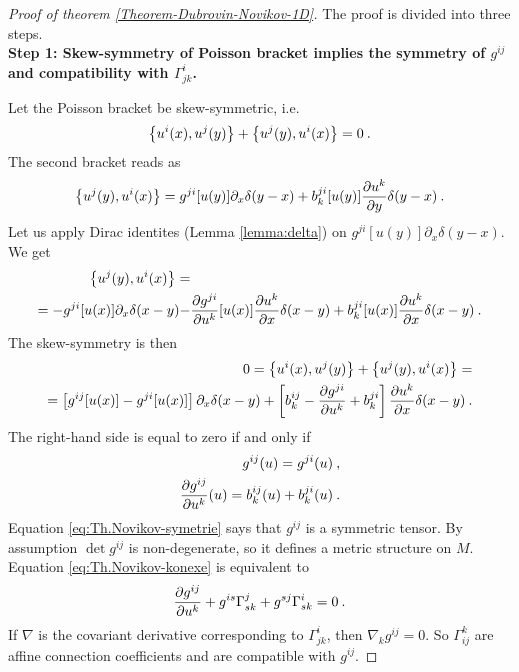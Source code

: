 \begin{proof}[Proof of theorem \ref{Theorem-Dubrovin-Novikov-1D}]
    The proof is divided into three steps.
    \\
    \textbf{Step 1: Skew-symmetry of Poisson bracket implies the symmetry of $g^{ij}$ and compatibility with $\Gamma^i_{jk}$.}

    Let the Poisson bracket be skew-symmetric, i.e.
    \begin{align}
        \left \lbrace u^i(x),u^j(y) \right \rbrace + \left \lbrace u^j(y),u^i(x) \right \rbrace = 0 \:.
    \end{align}
    The second bracket reads as
    \begin{align}
        \left \lbrace u^j(y),u^i(x) \right \rbrace =  g^{ji}[u(y)] \partial_x \delta(y-x) + b^{ji}_k[u(y)] \frac{\partial u^k}{\partial y} \delta(y-x) \:.
    \end{align}
    Let us apply Dirac identites (Lemma \vref{lemma:delta}) on $g^{ji}[u(y)]\partial_x \delta(y-x)$. We get
    \begin{align}
        \left \lbrace u^j(y),u^i(x) \right \rbrace =& \nonumber \\ 
        = - g^{ji} [u(x)] \partial_x \delta(x-y) -& \frac{\partial g^{ji}}{\partial u^k}[u(x)] \frac{\partial u^k}{\partial x} \delta(x-y) + b^{ji}_k[u(x)] \frac{\partial u^k}{\partial x} \delta(x-y)
        \:.
    \end{align}
    The skew-symmetry is then
    \begin{align}
        0 = \left \lbrace u^i(x),u^j(y) \right \rbrace + \left \lbrace u^j(y),u^i(x) \right \rbrace = \nonumber
        \\= \left[ g^{ij}[u(x)]  - g^{ji}[u(x)] \right] \partial_x \delta(x-y) + \left[ b^{ij}_k - \frac{\partial g^{ji}}{\partial u^k}  + b^{ji}_k  \right] \frac{\partial u^k}{\partial x} \delta(x-y) \:.
    \end{align}
    The right-hand side is equal to zero if and only if
    \begin{align}
        g^{ij}(u) = g^{ji}(u) \:, \label{eq:Th.Novikov-symetrie} \\
        \frac{\partial g^{ij}}{\partial u^k}(u) = b^{ij}_k(u) + b^{ji}_k(u)  \:. \label{eq:Th.Novikov-konexe}
    \end{align}
    Equation \eqref{eq:Th.Novikov-symetrie} says that $g^{ij}$ is a symmetric tensor. By assumption $\det g^{ij}$ is non-degenerate, so it defines a metric structure on $M$. Equation \eqref{eq:Th.Novikov-konexe} is equivalent to
    \begin{align}
        \frac{\partial g^{ij}}{\partial u^k} + g^{is} \Gamma_{sk}^j + g^{sj} \Gamma_{sk}^i = 0 \:.
    \end{align}
    If $\nabla$ is the covariant derivative corresponding to $\Gamma^i_{jk}$, then $\nabla_k g^{ij} = 0$. So $\Gamma_{ij}^k$ are affine connection coefficients and are compatible with $g^{ij}$.


\end{proof}
